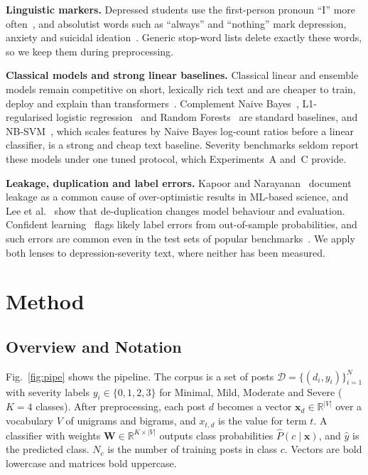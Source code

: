 \documentclass[conference]{IEEEtran}
\begin{document}
\textbf{Linguistic markers.} Depressed students use the first-person pronoun ``I'' more often~\cite{rude2004language}, and absolutist words such as ``always'' and ``nothing'' mark depression, anxiety and suicidal ideation~\cite{almosaiwi2018absolute}. Generic stop-word lists delete exactly these words, so we keep them during preprocessing.

\textbf{Classical models and strong linear baselines.} Classical linear and ensemble models remain competitive on short, lexically rich text and are cheaper to train, deploy and explain than transformers~\cite{guntuku2017detecting}. Complement Naive Bayes~\cite{rennie2003tackling}, L1-regularised logistic regression~\cite{tibshirani1996lasso,zou2005elasticnet} and Random Forests~\cite{breiman2001rf} are standard baselines, and NB-SVM~\cite{wang2012baselines}, which scales features by Naive Bayes log-count ratios before a linear classifier, is a strong and cheap text baseline. Severity benchmarks seldom report these models under one tuned protocol, which Experiments~A and~C provide.

\textbf{Leakage, duplication and label errors.} Kapoor and Narayanan~\cite{kapoor2023leakage} document leakage as a common cause of over-optimistic results in ML-based science, and Lee et al.~\cite{lee2022dedup} show that de-duplication changes model behaviour and evaluation. Confident learning~\cite{northcutt2021confident} flags likely label errors from out-of-sample probabilities, and such errors are common even in the test sets of popular benchmarks~\cite{northcutt2021pervasive}. We apply both lenses to depression-severity text, where neither has been measured.

\section{Method}

\subsection{Overview and Notation}

Fig.~\ref{fig:pipe} shows the pipeline. The corpus is a set of posts $\mathcal{D}=\{(d_i,y_i)\}_{i=1}^{N}$ with severity labels $y_i\in\{0,1,2,3\}$ for Minimal, Mild, Moderate and Severe ($K=4$ classes). After preprocessing, each post $d$ becomes a vector $\mathbf{x}_d\in\mathbb{R}^{|V|}$ over a vocabulary $V$ of unigrams and bigrams, and $x_{t,d}$ is the value for term $t$. A classifier with weights $\mathbf{W}\in\mathbb{R}^{K\times|V|}$ outputs class probabilities $\hat{P}(c\mid\mathbf{x})$, and $\hat{y}$ is the predicted class. $N_c$ is the number of training posts in class $c$. Vectors are bold lowercase and matrices bold uppercase.
\end{document}
